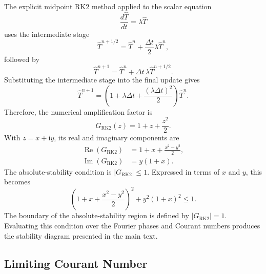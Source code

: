 The explicit midpoint RK2 method applied to the scalar equation
\begin{equation}
    \frac{d\hat{T}}{dt}=\lambda\hat{T}
\end{equation}
uses the intermediate stage
\begin{equation}
    \hat{T}^{n+1/2}
    =\hat{T}^n+\frac{\Delta t}{2}\lambda\hat{T}^n,
    \label{eq:app-rk2-stage-one}
\end{equation}
followed by
\begin{equation}
    \hat{T}^{n+1}
    =\hat{T}^n+\Delta t\,\lambda\hat{T}^{n+1/2}.
    \label{eq:app-rk2-stage-two}
\end{equation}
Substituting the intermediate stage into the final update gives
\begin{equation}
    \hat{T}^{n+1}
    =\left(1+\lambda\Delta t
    +\frac{(\lambda\Delta t)^2}{2}\right)\hat{T}^n.
\end{equation}
Therefore, the numerical amplification factor is
\begin{equation}
    \boxed{G_{\mathrm{RK2}}(z)=1+z+\frac{z^2}{2}}.
    \label{eq:app-rk2-amplification}
\end{equation}
With $z=x+\mathrm{i}y$, its real and imaginary components are
\begin{align}
    \operatorname{Re}(G_{\mathrm{RK2}})
    &=1+x+\frac{x^2-y^2}{2},
    \label{eq:app-rk2-amplification-real}\\
    \operatorname{Im}(G_{\mathrm{RK2}})
    &=y(1+x).
    \label{eq:app-rk2-amplification-imag}
\end{align}
The absolute-stability condition is $|G_{\mathrm{RK2}}|\leq 1$. Expressed in terms of $x$ and $y$, this becomes
\begin{equation}
    \boxed{
    \left(1+x+\frac{x^2-y^2}{2}\right)^2
    +y^2(1+x)^2\leq 1
    }.
    \label{eq:app-rk2-stability-condition}
\end{equation}
The boundary of the absolute-stability region is defined by $|G_{\mathrm{RK2}}|=1$. Evaluating this condition over the Fourier phases and Courant numbers produces the stability diagram presented in the main text.

\subsection{Limiting Courant Number}
\label{app:rk2-upwind-cfl-limit}


